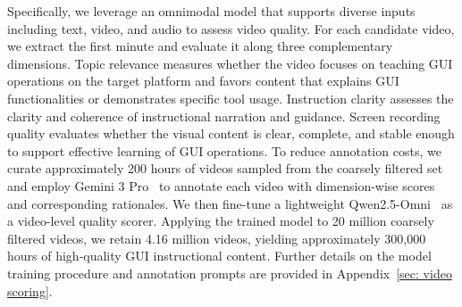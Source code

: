 \documentclass{llmxive}
\begin{document}

Specifically, we leverage an omnimodal model that supports diverse inputs including text, video, and audio to assess video quality. For each candidate video, we extract the first minute and evaluate it along three complementary dimensions. Topic relevance measures whether the video focuses on teaching GUI operations on the target platform and favors content that explains GUI functionalities or demonstrates specific tool usage. Instruction clarity assesses the clarity and coherence of instructional narration and guidance. Screen recording quality evaluates whether the visual content is clear, complete, and stable enough to support effective learning of GUI operations.
To reduce annotation costs, we curate approximately 200 hours of videos sampled from the coarsely filtered set and employ Gemini 3 Pro~\citep{comanici2025gemini} to annotate each video with dimension-wise scores and corresponding rationales. We then fine-tune a lightweight Qwen2.5-Omni~\citep{xu2025qwen2} as a video-level quality scorer. Applying the trained model to 20 million coarsely filtered videos, we retain 4.16 million videos, yielding approximately 300,000 hours of high-quality GUI instructional content. Further details on the model training procedure and annotation prompts are provided in Appendix~\ref{sec: video scoring}.


\end{document}
